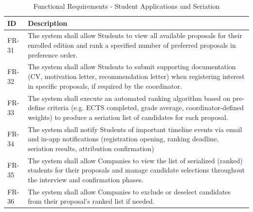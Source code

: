 {
    \begin{table}[H]
        \centering
        \caption{Functional Requirements - Student Applications and Seriation}
        \begin{tabular}{|l|p{12cm}|} %
            \hline
            \textbf{ID} & \textbf{Description} \\ \hline
            FR-31 & The system shall allow Students to view all available proposals for their enrolled edition and rank a specified number of preferred proposals in preference order. \\ \hline
            FR-32 & The system shall allow Students to submit supporting documentation (CV, motivation letter, recommendation letter) when registering interest in specific proposals, if required by the coordinator. \\ \hline
            FR-33 & The system shall execute an automated ranking algorithm based on pre-define criteria (e.g. ECTS completed, grade average, coordinator-defined weights) to produce a seriation list of candidates for each proposal. \\ \hline
            FR-34 & The system shall notify Students of important timeline events via email and in-app notifications (registration opening, ranking deadline, seriation results, attribution confirmation) \\ \hline
            FR-35 & The system shall allow Companies to view the list of serialized (ranked) students for their proposals and manage candidate selections throughout the interview and confirmation phases. \\ \hline
            FR-36 & The system shall allow Companies to exclude or deselect candidates from their proposal's ranked list if needed. \\ \hline
        \end{tabular}
    \end{table}    
}

